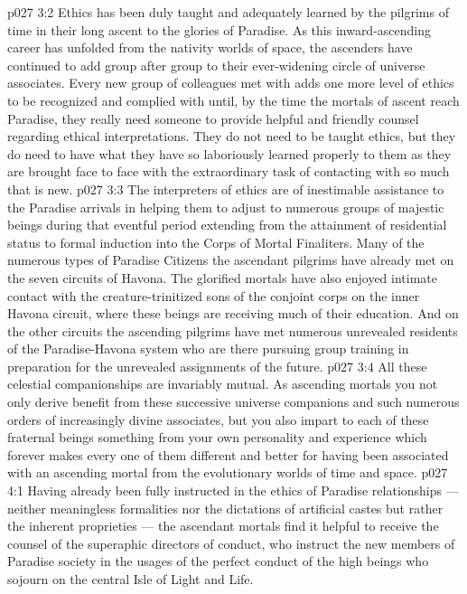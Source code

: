 \vs p027 3:2 Ethics has been duly taught and adequately learned by the pilgrims of time in their long ascent to the glories of Paradise. As this inward\hyp{}ascending career has unfolded from the nativity worlds of space, the ascenders have continued to add group after group to their ever\hyp{}widening circle of universe associates. Every new group of colleagues met with adds one more level of ethics to be recognized and complied with until, by the time the mortals of ascent reach Paradise, they really need someone to provide helpful and friendly counsel regarding ethical interpretations. They do not need to be taught ethics, but they do need to have what they have so laboriously learned properly  to them as they are brought face to face with the extraordinary task of contacting with so much that is new.
\vs p027 3:3 The interpreters of ethics are of inestimable assistance to the Paradise arrivals in helping them to adjust to numerous groups of majestic beings during that eventful period extending from the attainment of residential status to formal induction into the Corps of Mortal Finaliters. Many of the numerous types of Paradise Citizens the ascendant pilgrims have already met on the seven circuits of Havona. The glorified mortals have also enjoyed intimate contact with the creature\hyp{}trinitized sons of the conjoint corps on the inner Havona circuit, where these beings are receiving much of their education. And on the other circuits the ascending pilgrims have met numerous unrevealed residents of the Paradise\hyp{}Havona system who are there pursuing group training in preparation for the unrevealed assignments of the future.
\vs p027 3:4 All these celestial companionships are invariably mutual. As ascending mortals you not only derive benefit from these successive universe companions and such numerous orders of increasingly divine associates, but you also impart to each of these fraternal beings something from your own personality and experience which forever makes every one of them different and better for having been associated with an ascending mortal from the evolutionary worlds of time and space.
\vs p027 4:1 Having already been fully instructed in the ethics of Paradise relationships --- neither meaningless formalities nor the dictations of artificial castes but rather the inherent proprieties --- the ascendant mortals find it helpful to receive the counsel of the superaphic directors of conduct, who instruct the new members of Paradise society in the usages of the perfect conduct of the high beings who sojourn on the central Isle of Light and Life.
